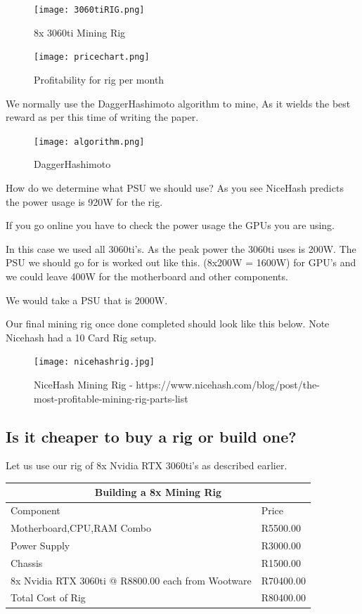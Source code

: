 \begin{figure}[H]
\centering
\texttt{[image: 3060tiRIG.png]}
\caption{8x 3060ti Mining Rig}
\label{fig:3060ti}
\end{figure}

\begin{figure}[H]
\centering
\texttt{[image: pricechart.png]}
\caption{Profitability for rig per month}
\label{fig:3060ti2}
\end{figure}

We normally use the DaggerHashimoto algorithm to mine, As it wields the best reward as per this time of writing the paper. 

\begin{figure}[H]
\centering
\texttt{[image: algorithm.png]}
\caption{DaggerHashimoto}
\label{fig:daggerhashimoto}
\end{figure}

How do we determine what PSU we should use?
As you see NiceHash predicts the power usage is 920W for the rig.

If you go online you have to check the power usage the GPUs you are using.

In this case we used all 3060ti's. As the peak power the 3060ti uses is 200W. The PSU we should go for is worked out like this.
(8x200W = 1600W) for GPU's and we could leave 400W for the motherboard and other components.

We would take a PSU that is 2000W.

Our final mining rig once done completed should look like this below. Note Nicehash had a 10 Card Rig setup.

\begin{figure}[H]
\centering
\texttt{[image: nicehashrig.jpg]}
\caption{NiceHash Mining Rig - https://www.nicehash.com/blog/post/the-most-profitable-mining-rig-parts-list}
\label{fig:nicehashrig}
\end{figure}

\subsection{Is it cheaper to buy a rig or build one?}

Let us use our rig of 8x Nvidia RTX 3060ti's as described earlier. \\

\begin{tabular}{ |p{6cm}||p{6cm}|}
    \hline
    \multicolumn{2}{|c|}{Building a 8x Mining Rig} \\
    \hline
    Component & Price\\
    \hline
    Motherboard,CPU,RAM Combo & R5500.00\\
    Power Supply & R3000.00\\
    Chassis & R1500.00\\
    8x Nvidia RTX 3060ti @ R8800.00 each from Wootware & R70400.00\\ 
    \hline
    Total Cost of Rig & R80400.00\\
    \hline
\end{tabular} \\ 

